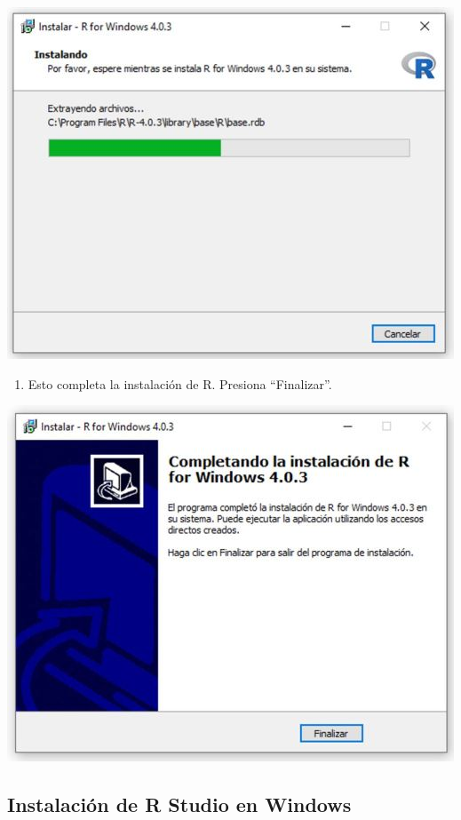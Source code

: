 \documentclass[
]{book}
\providecommand{\tightlist}{%
  \setlength{\itemsep}{0pt}\setlength{\parskip}{0pt}}
\begin{document}
\includegraphics{data/14.png}

\begin{enumerate}
\def\labelenumi{\arabic{enumi}.}
\setcounter{enumi}{14}
\tightlist
\item
  Esto completa la instalación de R. Presiona ``Finalizar''.
\end{enumerate}

\includegraphics{data/15.png}

\hypertarget{instalaciuxf3n-de-r-studio-en-windows}{%
\subsection{Instalación de R Studio en Windows}\label{instalaciuxf3n-de-r-studio-en-windows}}
\end{document}
